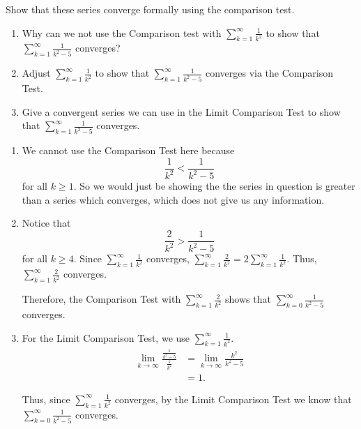 \documentclass[handout]{ximera}
\begin{document}
\begin{instructorNotes}
Show that these series converge formally using the comparison test.
\end{instructorNotes}


\begin{problem}
	\begin{enumerate}
	
	\item  Why can we not use the Comparison test with $\sum_{k=1}^\infty \frac{1}{k^2}$ to show that $\sum_{k=1}^\infty \frac{1}{k^2 - 5}$ converges?
	
	\item  Adjust $\sum_{k=1}^\infty \frac{1}{k^2}$ to show that $\sum_{k=1}^\infty \frac{1}{k^2 - 5}$ converges via the Comparison Test.
	
	\item  Give a convergent series we can use in the Limit Comparison Test to show that $\sum_{k=1}^\infty \frac{1}{k^2 - 5}$ converges.  
	
	\end{enumerate}
	
	\begin{freeResponse}
		\begin{enumerate}
		
		\item  We cannot use the Comparison Test here because 
			\[
			\frac{1}{k^2} < \frac{1}{k^2 - 5}
			\]
		for all $k \geq 1$.  So we would just be showing the the series in question is greater than a series which converges, which does not give us any information.
		
		
		
		\item  Notice that
			\[
			\frac{2}{k^2} > \frac{1}{k^2 - 5}
			\]
		for all $k \geq 4$.  
		Since $\sum_{k=1}^\infty \frac{1}{k^2}$ converges, $\sum_{k=1}^\infty \frac{2}{k^2} = 2 \sum_{k=1}^\infty \frac{1}{k^2}$.  
		Thus, $\sum_{k=1}^\infty \frac{2}{k^2}$ converges.
		
		Therefore, the Comparison Test with $\sum_{k=1}^\infty \frac{2}{k^2}$ shows that $\sum_{k=0}^\infty \frac{1}{k^2-5}$ converges.
		
		
		
		\item  For the Limit Comparison Test, we  use $\sum_{k=1}^\infty \frac{1}{k^2}$.  
			\begin{align*}
			\lim_{k \to \infty} \frac{\frac{1}{k^2-5}}{\frac{1}{k^2}}
			&= \lim_{k \to \infty} \frac{k^2}{k^2-5}  \\
			&= 1.
			\end{align*}
			
		Thus, since $\sum_{k=1}^\infty \frac{1}{k^2}$ converges, by the Limit Comparison Test we know that $\sum_{k=0}^\infty \frac{1}{k^2-5}$ converges.
		
		\end{enumerate}
	\end{freeResponse}

\end{problem}
\end{document}
